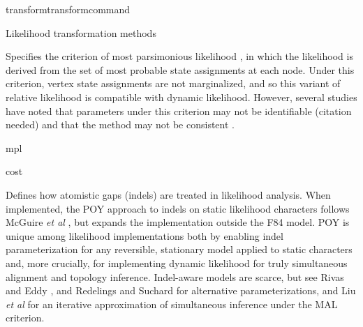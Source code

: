 \begin{command}{transform}{transformcommand}
\begin{arguments}
\begin{argumentgroup}{Likelihood transformation methods}
{\begin{description}
                            {Specifies the criterion of most parsimonious likelihood
                            \cite{barryandhartigan1987}, in which the likelihood is
                            derived from the set of most probable state assignments
                            at each node. Under this criterion, vertex state
                            assignments are not marginalized, and so this variant of
                            relative likelihood is compatible with dynamic
                            likelihood. However, several studies have noted that
                            parameters under this criterion may not be identifiable
                            (citation needed) and that the method may not be consistent
                            \cite[for example]{mossel2009shrinkage}.
   
                            }
                            {mpl}

                    \end{description}}
                    {cost}

                    {Defines how atomistic gaps (indels) are treated in
                    likelihood analysis. When implemented, the POY approach to
                    indels on static likelihood characters follows McGuire \emph{et al} 
                    \cite{mcguire2001models}, but expands the implementation outside the F84
                    model. POY is unique among likelihood implementations both
                    by enabling indel parameterization for any reversible,
                    stationary model applied to static characters and, more
                    crucially, for implementing dynamic likelihood for truly
                    simultaneous alignment and topology inference. Indel-aware
                    models are scarce, but see Rivas and Eddy \cite{rivas2008probabilistic}, 
                    and Redelings and Suchard \cite{redelings2005joint,redelings2007incorporating}
                    for alternative parameterizations,
                    and Liu \emph{et al} \cite{liu2009rapid,liusateII2012} for an iterative approximation of
                    simultaneous inference under the MAL criterion.

}
\end{argumentgroup}
\end{arguments}
\end{command}
